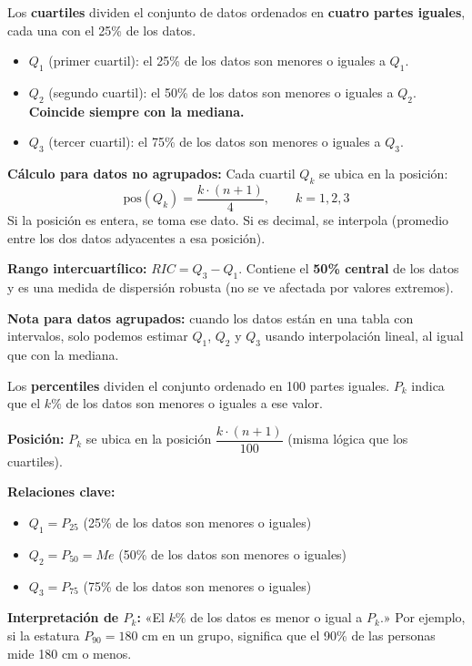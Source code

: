 \documentclass[11pt, letterpaper]{article}
\begin{document}
\begin{tcolorbox}[importantbox, title={Cuartiles $Q_1$, $Q_2$, $Q_3$}]
Los \textbf{cuartiles} dividen el conjunto de datos ordenados en \textbf{cuatro partes iguales}, cada una con el 25\% de los datos.

\begin{itemize}
  \item $Q_1$ (primer cuartil): el 25\% de los datos son menores o iguales a $Q_1$.
  \item $Q_2$ (segundo cuartil): el 50\% de los datos son menores o iguales a $Q_2$. \textbf{Coincide siempre con la mediana.}
  \item $Q_3$ (tercer cuartil): el 75\% de los datos son menores o iguales a $Q_3$.
\end{itemize}

\textbf{Cálculo para datos no agrupados:}
Cada cuartil $Q_k$ se ubica en la posición:
\[
\text{pos}(Q_k) = \frac{k \cdot (n+1)}{4}, \qquad k = 1, 2, 3
\]
Si la posición es entera, se toma ese dato. Si es decimal, se interpola (promedio entre los dos datos adyacentes a esa posición).

\medskip
\textbf{Rango intercuartílico:} $RIC = Q_3 - Q_1$. Contiene el \textbf{50\% central} de los datos y es una medida de dispersión robusta (no se ve afectada por valores extremos).

\medskip
\textbf{Nota para datos agrupados:} cuando los datos están en una tabla con intervalos, solo podemos estimar $Q_1$, $Q_2$ y $Q_3$ usando interpolación lineal, al igual que con la mediana.
\end{tcolorbox}

\begin{tcolorbox}[importantbox, title={Percentiles $P_k$}]
Los \textbf{percentiles} dividen el conjunto ordenado en 100 partes iguales. $P_k$ indica que el $k\%$ de los datos son menores o iguales a ese valor.

\textbf{Posición:} $P_k$ se ubica en la posición $\dfrac{k \cdot (n+1)}{100}$ (misma lógica que los cuartiles).

\textbf{Relaciones clave:}
\begin{itemize}
  \item $Q_1 = P_{25}$ \quad (25\% de los datos son menores o iguales)
  \item $Q_2 = P_{50} = Me$ \quad (50\% de los datos son menores o iguales)
  \item $Q_3 = P_{75}$ \quad (75\% de los datos son menores o iguales)
\end{itemize}

\textbf{Interpretación de $P_k$:} «El $k\%$ de los datos es menor o igual a $P_k$.» Por ejemplo, si la estatura $P_{90} = 180$ cm en un grupo, significa que el 90\% de las personas mide 180 cm o menos.
\end{tcolorbox}
\end{document}
